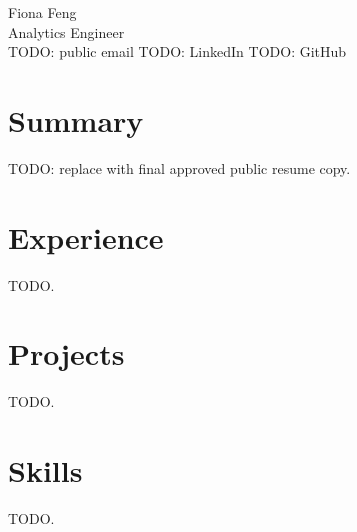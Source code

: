 \documentclass[11pt]{article}
\begin{document}
\begin{center}
{\Large Fiona Feng}\\
Analytics Engineer\\
TODO: public email \quad TODO: LinkedIn \quad TODO: GitHub
\end{center}

\section*{Summary}
TODO: replace with final approved public resume copy.

\section*{Experience}
TODO.

\section*{Projects}
TODO.

\section*{Skills}
TODO.
\end{document}
